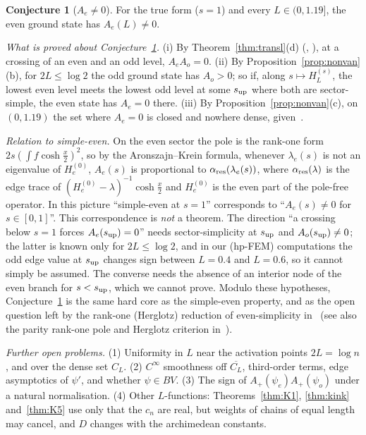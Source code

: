 \documentclass[11pt]{amsart}
\theoremstyle{definition}
\newtheorem{conjecture}[theorem]{Conjecture}
\theoremstyle{remark}
\numberwithin{equation}{section}
\begin{document}
\begin{conjecture}[$A_e\ne0$]\label{conj:Ae}
For the true form ($s=1$) and every $L\in(0,1.19]$, the even ground state has $A_e(L)\ne0$.
\end{conjecture}

\emph{What is proved about Conjecture~\ref{conj:Ae}.} (i) By Theorem~\ref{thm:transl}(d) (\cite[(6.3)]{BT26}, \cite{SoDa}), at a crossing of an even and an odd level, $A_eA_o=0$. (ii) By Proposition~\ref{prop:nonvan}(b), for $2L\le\log2$ the odd ground state has $A_o>0$; so if, along $s\mapsto H^{(s)}_L$, the lowest even level meets the lowest odd level at some $s_{\rm up}$ where both are sector-simple, the even state has $A_e=0$ there. (iii) By Proposition~\ref{prop:nonvan}(c), on $(0,1.19)$ the set where $A_e=0$ is closed and nowhere dense, given~\cite{GS}.

\emph{Relation to simple-even.} On the even sector the pole is the rank-one form $2s(\int f\cosh\frac x2)^2$, so by the Aronszajn--Krein formula, whenever $\lambda_e(s)$ is not an eigenvalue of $H^{(0)}_e$, $A_e(s)$ is proportional to $\alpha_{\rm res}(\lambda_e(s))$, where $\alpha_{\rm res}(\lambda)$ is the edge trace of $(H^{(0)}_e-\lambda)^{-1}\cosh\frac x2$ and $H^{(0)}_e$ is the even part of the pole-free operator. In this picture ``simple-even at $s=1$'' corresponds to ``$A_e(s)\ne0$ for $s\in[0,1]$''. This correspondence is \emph{not} a theorem. The direction ``a crossing below $s=1$ forces $A_e(s_{\rm up})=0$'' needs sector-simplicity at $s_{\rm up}$ and $A_o(s_{\rm up})\neq0$; the latter is known only for $2L\le\log2$, and in our (hp-FEM) computations the odd edge value at $s_{\rm up}$ changes sign between $L=0.4$ and $L=0.6$, so it cannot simply be assumed. The converse needs the absence of an interior node of the even branch for $s<s_{\rm up}$, which we cannot prove. Modulo these hypotheses, Conjecture~\ref{conj:Ae} is the same hard core as the simple-even property, and as the open question left by the rank-one (Herglotz) reduction of even-simplicity in~\cite{And3} (see also the parity rank-one pole and Herglotz criterion in~\cite{Oen}).

\emph{Further open problems.} (1) Uniformity in $L$ near the activation points $2L=\log n$, and over the dense set $C_L$. (2) $C^\infty$ smoothness off $\overline{C_L}$, third-order terms, edge asymptotics of $\psi'$, and whether $\psi\in BV$. (3) The sign of $A_+(\psi_e)A_+(\psi_o)$ under a natural normalisation. (4) Other $L$-functions: Theorems~\ref{thm:K1}, \ref{thm:kink} and~\ref{thm:K5} use only that the $c_n$ are real, but weights of chains of equal length may cancel, and $D$ changes with the archimedean constants.
\end{document}
